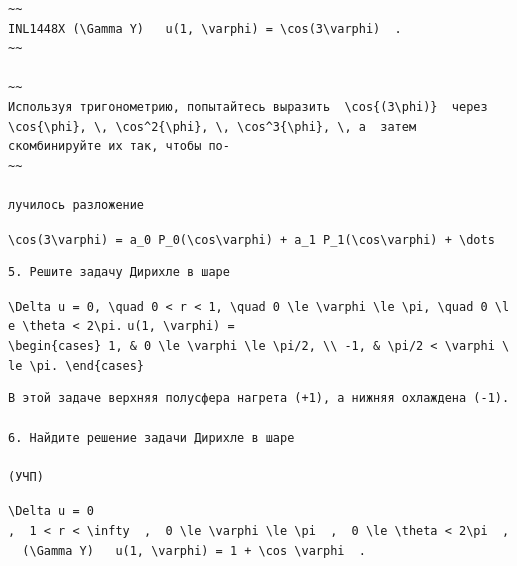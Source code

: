\documentclass[
  ukrainian,
]{article}
\begin{document}
\begin{verbatim}
~~
INL1448X (\Gamma Y)   u(1, \varphi) = \cos(3\varphi)  .
~~

~~
Используя тригонометрию, попытайтесь выразить  \cos{(3\phi)}  через  \cos{\phi}, \, \cos^2{\phi}, \, \cos^3{\phi}, \, a  затем скомбинируйте их так, чтобы по-
~~

лучилось разложение
\end{verbatim}

\texttt{\textbackslash{}cos(3\textbackslash{}varphi)\ =\ a\_0\ P\_0(\textbackslash{}cos\textbackslash{}varphi)\ +\ a\_1\ P\_1(\textbackslash{}cos\textbackslash{}varphi)\ +\ \textbackslash{}dots}

\begin{verbatim}
5. Решите задачу Дирихле в шаре
\end{verbatim}

\texttt{\textbackslash{}Delta\ u\ =\ 0,\ \textbackslash{}quad\ 0\ \textless{}\ r\ \textless{}\ 1,\ \textbackslash{}quad\ 0\ \textbackslash{}le\ \textbackslash{}varphi\ \textbackslash{}le\ \textbackslash{}pi,\ \textbackslash{}quad\ 0\ \textbackslash{}le\ \textbackslash{}theta\ \textless{}\ 2\textbackslash{}pi.}
\texttt{u(1,\ \textbackslash{}varphi)\ =}
\texttt{\textbackslash{}begin\{cases\}\ 1,\ \&\ 0\ \textbackslash{}le\ \textbackslash{}varphi\ \textbackslash{}le\ \textbackslash{}pi/2,\ \textbackslash{}\textbackslash{}\ -1,\ \&\ \textbackslash{}pi/2\ \textless{}\ \textbackslash{}varphi\ \textbackslash{}le\ \textbackslash{}pi.\ \textbackslash{}end\{cases\}}

\begin{verbatim}
В этой задаче верхняя полусфера нагрета (+1), а нижняя охлаждена (-1).

6. Найдите решение задачи Дирихле в шаре

(УЧП)
\end{verbatim}

\texttt{\textbackslash{}Delta\ u\ =\ 0}
\texttt{,\ \ 1\ \textless{}\ r\ \textless{}\ \textbackslash{}infty\ \ ,\ \ 0\ \textbackslash{}le\ \textbackslash{}varphi\ \textbackslash{}le\ \textbackslash{}pi\ \ ,\ \ 0\ \textbackslash{}le\ \textbackslash{}theta\ \textless{}\ 2\textbackslash{}pi\ \ ,\ \ (\textbackslash{}Gamma\ Y)\ \ \ u(1,\ \textbackslash{}varphi)\ =\ 1\ +\ \textbackslash{}cos\ \textbackslash{}varphi\ \ .}
\end{document}

